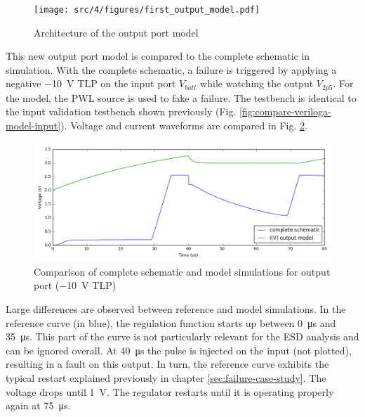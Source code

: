 \begin{figure}[!h]
  \centering
  \texttt{[image: src/4/figures/first\_output\_model.pdf]}
  \caption{Architecture of the output port model}
  \label{fig:first-output-model}
\end{figure}

This new output port model is compared to the complete schematic in simulation.
With the complete schematic, a failure is triggered by applying a negative \SI{-10}{\volt} TLP on the input port $V_{batt}$ while watching the output $V_{2p5}$.
For the model, the PWL source is used to fake a failure.
The testbench is identical to the input validation testbench shown previously (Fig. \ref{fig:compare-veriloga-model-input}).
Voltage and current waveforms are compared in Fig. \ref{fig:compare-model-simu-m10-output}.

\begin{figure}[!h]
  \centering
  \includegraphics[width=\textwidth]{src/4/figures/comparison_model_total_output_bad_m10V.png}
  \caption{Comparison of complete schematic and model simulations for output port (\SI{-10}{\volt} TLP)}
  \label{fig:compare-model-simu-m10-output}
\end{figure}

Large differences are observed between reference and model simulations.
In the reference curve (in blue), the regulation function starts up between \SI{0}{\micro\second} and \SI{35}{\micro\second}.
This part of the curve is not particularly relevant for the ESD analysis and can be ignored overall.
At \SI{40}{\micro\second} the pulse is injected on the input (not plotted), resulting in a fault on this output.
In turn, the reference curve exhibits the typical restart explained previously in chapter \ref{sec:failure-case-study}.
The voltage drops until \SI{1}{\volt}.
The regulator restarts until it is operating properly again at \SI{75}{\micro\second}.

